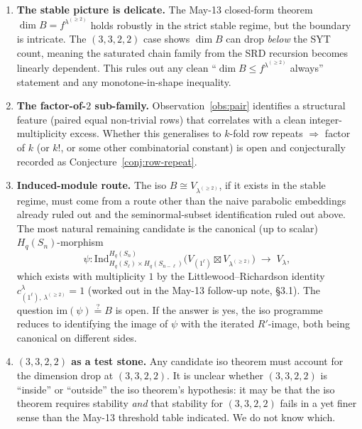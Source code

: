 \documentclass[11pt]{article}
\theoremstyle{definition}
\begin{document}
\begin{enumerate}[leftmargin=2em,topsep=0.3em,itemsep=0.3em]
\item \textbf{The stable picture is delicate.} The May-13 closed-form
theorem $\dim B = f^{\lambda^{(\ge 2)}}$ holds robustly in the strict
stable regime, but the boundary is intricate. The $(3,3,2,2)$ case
shows $\dim B$ can drop \emph{below} the SYT count, meaning the
saturated chain family from the SRD recursion becomes linearly
dependent. This rules out any clean ``$\dim B \le f^{\lambda^{(\ge 2)}}$
always'' statement and any monotone-in-shape inequality.

\item \textbf{The factor-of-$2$ sub-family.} Observation~\ref{obs:pair}
identifies a structural feature (paired equal non-trivial rows) that
correlates with a clean integer-multiplicity excess. Whether this
generalises to $k$-fold row repeats $\Rightarrow$ factor of $k$ (or
$k!$, or some other combinatorial constant) is open and conjecturally
recorded as Conjecture~\ref{conj:row-repeat}.

\item \textbf{Induced-module route.} The iso $B \cong V_{\lambda^{(\ge 2)}}$,
if it exists in the stable regime, must come from a route other than the
naive parabolic embeddings already ruled out and the seminormal-subset
identification ruled out above. The most natural remaining candidate is
the canonical (up to scalar) $H_q(S_n)$-morphism
\[
   \psi : \mathrm{Ind}_{H_q(S_\ell) \times H_q(S_{n-\ell})}^{H_q(S_n)}
            \!\bigl( V_{(1^\ell)} \boxtimes V_{\lambda^{(\ge 2)}} \bigr)
        \;\longrightarrow\; V_\lambda,
\]
which exists with multiplicity $1$ by the Littlewood--Richardson identity
$c^\lambda_{(1^\ell),\,\lambda^{(\ge 2)}} = 1$ (worked out in the May-13
follow-up note, \S 3.1). The question $\mathrm{im}(\psi) \stackrel{?}{=} B$
is open. If the answer is yes, the iso programme reduces to identifying
the image of $\psi$ with the iterated $R'$-image, both being canonical
on different sides.

\item \textbf{$(3,3,2,2)$ as a test stone.} Any candidate iso theorem
must account for the dimension drop at $(3,3,2,2)$. It is unclear
whether $(3,3,2,2)$ is ``inside'' or ``outside'' the iso theorem's
hypothesis: it may be that the iso theorem requires stability \emph{and}
that stability for $(3,3,2,2)$ fails in a yet finer sense than the May-13
threshold table indicated. We do not know which.
\end{enumerate}
\end{document}
